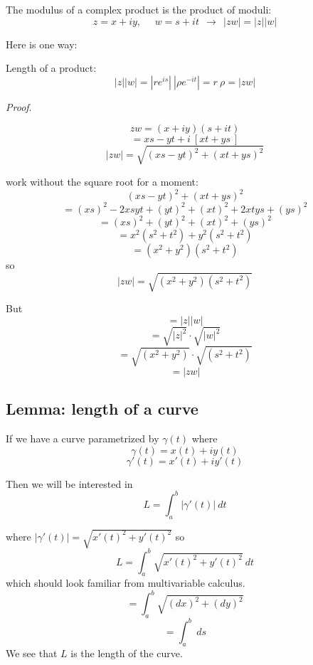 \documentclass[11pt, oneside]{article}
\begin{document}
\label{sec:product_of_moduli}

The modulus of a complex product is the product of moduli:
\[ z = x + iy, \ \ \ \ \ \ w = s + it  \ \ \rightarrow \ \  |zw| = |z||w| \]

Here is one way:

Length of a product:
\[ |z| |w| = |re^{is}| \  |\rho e^{-it}| = r \ \rho= |zw| \]

\emph{Proof}.

\[ zw = (x + iy)(s + it) \]
\[ = xs - yt + i \ [ xt + ys \ ] \]
\[ |zw| = \sqrt{ (xs - yt)^2 + (xt + ys)^2 } \]

work without the square root for a moment:
\[ (xs - yt)^2 + (xt + ys)^2 \]
\[ = (xs)^2 - 2xsyt + (yt)^2 + (xt)^2 + 2xtys + (ys)^2 \]
\[ = (xs)^2 + (yt)^2 + (xt)^2 + (ys)^2 \]
\[ = x^2 (s^2 + t^2) + y^2 (s^2 + t^2) \]
\[ = (x^2 + y^2)(s^2 + t^2) \]
so
\[ |zw| = \sqrt{(x^2 + y^2)(s^2 + t^2)} \]

But
\[ = |z| |w| \]
\[ = \sqrt{|z|^2} \cdot \sqrt{|w|^2} \]
\[ = \sqrt{(x^2 + y^2)} \cdot \sqrt{(s^2 + t^2)} \]
\[ = |zw| \]

\subsection*{Lemma:  length of a curve}

\label{sec:length_of_curve}

If we have a curve parametrized by $\gamma(t)$ where
\[ \gamma(t) = x(t) + i y(t) \]
\[ \gamma'(t) = x'(t) + i y'(t) \]

Then we will be interested in
\[ L = \int_a^b |\gamma'(t)| \ dt \]

where $|\gamma'(t)| = \sqrt{x'(t)^2 + y'(t)^2}$ so
\[ L = \int_a^b \sqrt{x'(t)^2 + y'(t)^2} \ dt \]
which should look familiar from multivariable calculus.
\[ = \int_a^b \sqrt{(dx)^2 + (dy)^2 } \]
\[ = \int_a^b \ ds  \]
We see that $L$ is the length of the curve.
\end{document}
